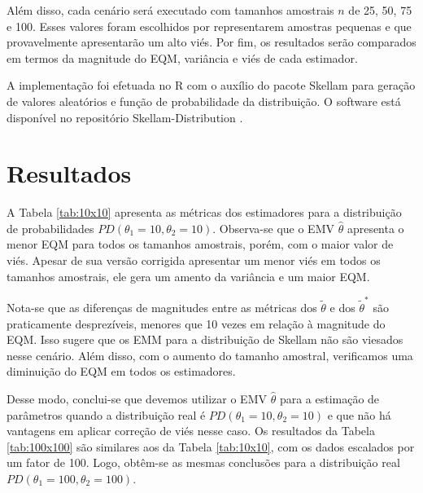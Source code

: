 \documentclass[12pt]{article}
\theoremstyle{definition}
\begin{document}
Além disso, cada cenário será executado com tamanhos amostrais $n$ de 25, 50, 75 e 100. Esses valores foram escolhidos por representarem amostras pequenas e que provavelmente apresentarão um alto viés. Por fim, os resultados serão comparados em termos da magnitude do EQM, variância e viés de cada estimador.

A implementação foi efetuada no R \cite{R2023} com o auxílio do pacote Skellam \cite{SKELLAM106} para geração de valores aleatórios e função de probabilidade da distribuição. O software está disponível no repositório Skellam-Distribution \cite{antonino2023}.

\section{Resultados}

A Tabela \ref{tab:10x10} apresenta as métricas dos estimadores para a distribuição de probabilidades $PD(\theta_1=10, \theta_2=10)$. Observa-se que o EMV $\hat{\theta}$ apresenta o menor EQM para todos os tamanhos amostrais, porém, com o maior valor de viés. Apesar de sua versão corrigida apresentar um menor viés em todos os tamanhos amostrais, ele gera um amento da variância e um maior EQM.

Nota-se que as diferenças de magnitudes entre as métricas dos $\tilde{\theta}$ e dos $\tilde{\theta}^*$ são praticamente desprezíveis, menores que 10 vezes em relação à magnitude do EQM. Isso sugere que os EMM para a distribuição de Skellam não são viesados nesse cenário. Além disso, com o aumento do tamanho amostral, verificamos uma diminuição do EQM em todos os estimadores.

Desse modo, conclui-se que devemos utilizar o EMV $\hat{\theta}$ para a estimação de parâmetros quando a distribuição real é $PD(\theta_1=10, \theta_2=10)$ e que não há vantagens em aplicar correção de viés nesse caso. Os resultados da Tabela \ref{tab:100x100} são similares aos da Tabela \ref{tab:10x10}, com os dados escalados por um fator de 100. Logo, obtêm-se as mesmas conclusões para a distribuição real $PD(\theta_1=100, \theta_2=100)$.
\end{document}
